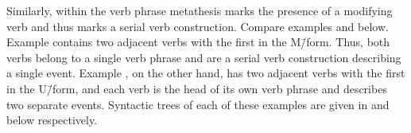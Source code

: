 
Similarly, within the verb phrase metathesis marks the presence
of a modifying verb and thus marks a serial verb construction.
Compare examples  and  below.
Example  contains two adjacent verbs with the first in the M\=/form.
Thus, both verbs belong to a single verb phrase and
are a serial verb construction describing a single event.
Example , on the other hand,
has two adjacent verbs with the first in the U\=/form,
and each verb is the head of its own verb phrase
and describes two separate events.
Syntactic trees of each of these examples are
given in  and 
below respectively.

